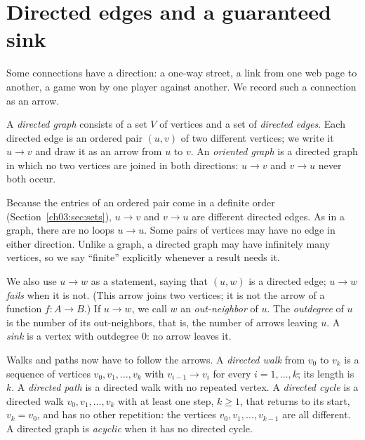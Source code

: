 \section{Directed edges and a guaranteed sink}\label{ch07:sec:sink}
Some connections have a direction: a one-way street, a link from one web page to another, a game won by one player against another. We record such a connection as an arrow.

\par\noindent\begin{minipage}{\linewidth}
\begin{definition}\label{ch07:def:directed}
A \emph{directed graph} consists of a set $V$ of vertices and a set of \emph{directed edges}. Each directed edge is an ordered pair $(u,v)$ of two different vertices; we write it $u\to v$ and draw it as an arrow from $u$ to $v$. An \emph{oriented graph} is a directed graph in which no two vertices are joined in both directions: $u\to v$ and $v\to u$ never both occur.
\end{definition}
\end{minipage}\par

Because the entries of an ordered pair come in a definite order (Section~\ref{ch03:sec:sets}), $u\to v$ and $v\to u$ are different directed edges. As in a graph, there are no loops $u\to u$. Some pairs of vertices may have no edge in either direction. Unlike a graph, a directed graph may have infinitely many vertices, so we say ``finite'' explicitly whenever a result needs it.

We also use $u\to w$ as a statement, saying that $(u,w)$ is a directed edge; $u\to w$ \emph{fails} when it is not. (This arrow joins two vertices; it is not the arrow of a function $f:A\to B$.) If $u\to w$, we call $w$ an \emph{out-neighbor} of $u$. The \emph{outdegree} of $u$ is the number of its out-neighbors, that is, the number of arrows leaving $u$. A \emph{sink} is a vertex with outdegree $0$: no arrow leaves it.

Walks and paths now have to follow the arrows. A \emph{directed walk} from $v_0$ to $v_k$ is a sequence of vertices $v_0,v_1,\ldots,v_k$ with $v_{i-1}\to v_i$ for every $i=1,\ldots,k$; its length is $k$. A \emph{directed path} is a directed walk with no repeated vertex. A \emph{directed cycle} is a directed walk $v_0,v_1,\ldots,v_k$ with at least one step, $k\ge1$, that returns to its start, $v_k=v_0$, and has no other repetition: the vertices $v_0,v_1,\ldots,v_{k-1}$ are all different. A directed graph is \emph{acyclic} when it has no directed cycle.

